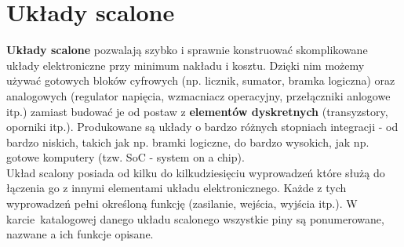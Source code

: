 % 
% 
% 
% 

\section{Układy scalone}
\textbf{Układy scalone} pozwalają szybko i sprawnie konstruować skomplikowane układy elektroniczne przy minimum nakładu i kosztu. Dzięki nim możemy
używać gotowych bloków cyfrowych (np. licznik, sumator, bramka logiczna) oraz analogowych (regulator napięcia, wzmacniacz operacyjny,
przełączniki anlogowe itp.) zamiast budować je od postaw z \textbf{elementów dyskretnych} (transyzstory, oporniki itp.). Produkowane są
układy o bardzo różnych stopniach integracji - od bardzo niskich, takich jak np. bramki logiczne, do bardzo wysokich, jak np. gotowe komputery
(tzw. SoC - system on a chip).
\\

Układ scalony posiada od kilku do kilkudziesięciu wyprowadzeń które służą do łączenia go z innymi elementami układu elektronicznego.
Każde z tych wyprowadzeń pełni określoną funkcję (zasilanie, wejścia, wyjścia itp.). W karcie~katalogowej danego układu scalonego wszystkie
piny są ponumerowane, nazwane a ich funkcje opisane.
\\

